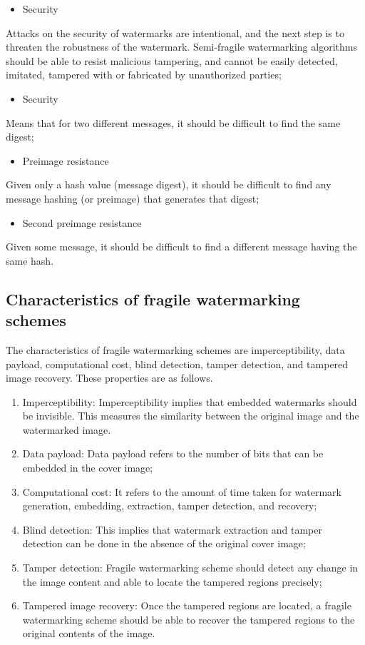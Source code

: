 \documentclass[a4paper, 12pt]{gji}
\begin{document}
\begin{itemize}
    \item Security
\end{itemize}
\qquad Attacks on the security of watermarks are intentional, and the next step is to threaten the robustness of the watermark. Semi-fragile watermarking algorithms should be able to resist malicious tampering, and cannot be easily detected, imitated, tampered with or fabricated by unauthorized parties;

\begin{itemize}
    \item Security
\end{itemize}
\qquad Means that for two different messages, it should be difficult to find the same digest;

\begin{itemize}
    \item Preimage resistance
\end{itemize}
\qquad Given only a hash value (message digest), it should be difficult to find any message hashing (or preimage) that generates that digest;

\begin{itemize}
    \item Second preimage resistance
\end{itemize}
\qquad Given some message, it should be difficult to find a different message having the same hash.

\subsection{Characteristics of fragile watermarking schemes}
The characteristics of fragile watermarking schemes are imperceptibility, data payload, computational cost, blind detection, tamper detection, and tampered image recovery. These properties are as follows.
\begin{enumerate}
\item Imperceptibility: Imperceptibility implies that embedded watermarks should be invisible. This measures the similarity between the original image and the watermarked image.
\item Data payload: Data payload refers to the number of bits that can be embedded in the cover image;
\item Computational cost: It refers to the amount of time taken for watermark generation, embedding, extraction, tamper detection, and recovery;
\item Blind detection: This implies that watermark extraction and tamper detection can be done in the absence of the original cover image;
\item Tamper detection: Fragile watermarking scheme should detect any change in the image content and able to locate the tampered regions precisely;
\item Tampered image recovery: Once the tampered regions are located, a fragile watermarking scheme should be able to recover the tampered regions to the original contents of the image.
\end{enumerate}
\end{document}
